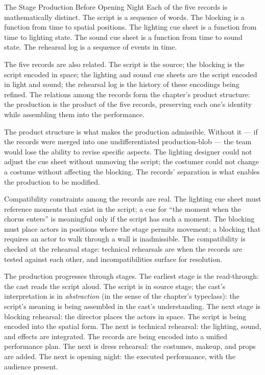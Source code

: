 \begin{coda}{The Stage Production Before Opening Night}
Each of the five records is mathematically distinct. The script is
a sequence of words. The blocking is a function from time to spatial
positions. The lighting cue sheet is a function from time to
lighting state. The sound cue sheet is a function from time to
sound state. The rehearsal log is a sequence of events in time.

The five records are also related. The script is the source; the
blocking is the script encoded in space; the lighting and sound
cue sheets are the script encoded in light and sound; the
rehearsal log is the history of these encodings being refined.
The relations among the records form the chapter's product
structure: the production is the product of the five records,
preserving each one's identity while assembling them into the
performance.

The product structure is what makes the production admissible.
Without it --- if the records were merged into one
undifferentiated production-blob --- the team would lose the
ability to revise specific aspects. The lighting designer could
not adjust the cue sheet without unmoving the script; the
costumer could not change a costume without affecting the
blocking. The records' separation is what enables the
production to be modified.

Compatibility constraints among the records are real. The
lighting cue sheet must reference moments that exist in the
script; a cue for ``the moment when the chorus enters'' is
meaningful only if the script has such a moment. The blocking
must place actors in positions where the stage permits movement;
a blocking that requires an actor to walk through a wall is
inadmissible. The compatibility is checked at the rehearsal
stage: technical rehearsals are when the records are tested
against each other, and incompatibilities surface for
resolution.

The production progresses through stages. The earliest stage is
the read-through: the cast reads the script aloud. The script is
in source stage; the cast's interpretation is in
\emph{abstraction} (in the sense of the chapter's typeclass):
the script's meaning is being assembled in the cast's
understanding. The next stage is blocking rehearsal: the
director places the actors in space. The script is being
encoded into the spatial form. The next is technical rehearsal:
the lighting, sound, and effects are integrated. The records
are being encoded into a unified performance plan. The next is
dress rehearsal: the costumes, makeup, and props are added.
The next is opening night: the executed performance, with the
audience present.


\end{coda}
